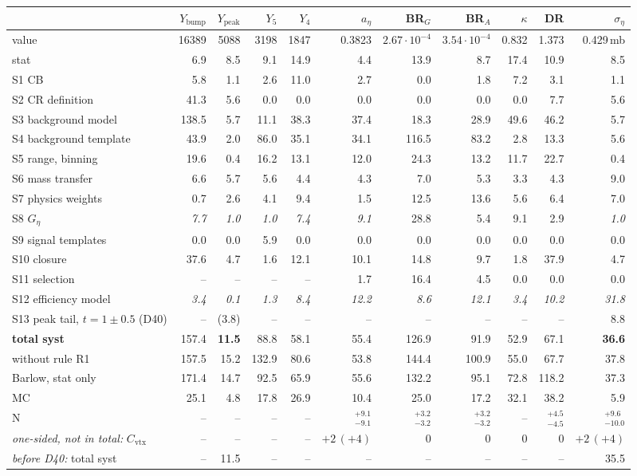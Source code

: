 \begin{tabular}{lrrrrrrrrrr}
\toprule
 & $Y_\mathrm{bump}$ & $Y_\mathrm{peak}$ & $Y_5$ & $Y_4$ & $a_\eta$ & BR$_G$ & BR$_A$ & $\kappa$ & DR & $\sigma_\eta$ \\
\midrule
value & 16389 & 5088 & 3198 & 1847 & 0.3823 & $2.67\cdot10^{-4}$ & $3.54\cdot10^{-4}$ & 0.832 & 1.373 & 0.429\,mb \\
stat & 6.9 & 8.5 & 9.1 & 14.9 & 4.4 & 13.9 & 8.7 & 17.4 & 10.9 & 8.5 \\
\midrule
S1 CB & 5.8 & 1.1 & 2.6 & 11.0 & 2.7 & 0.0 & 1.8 & 7.2 & 3.1 & 1.1 \\
S2 CR definition & 41.3 & 5.6 & 0.0 & 0.0 & 0.0 & 0.0 & 0.0 & 0.0 & 7.7 & 5.6 \\
S3 background model & 138.5 & 5.7 & 11.1 & 38.3 & 37.4 & 18.3 & 28.9 & 49.6 & 46.2 & 5.7 \\
S4 background template & 43.9 & 2.0 & 86.0 & 35.1 & 34.1 & 116.5 & 83.2 & 2.8 & 13.3 & 5.6 \\
S5 range, binning & 19.6 & 0.4 & 16.2 & 13.1 & 12.0 & 24.3 & 13.2 & 11.7 & 22.7 & 0.4 \\
S6 mass transfer & 6.6 & 5.7 & 5.6 & 4.4 & 4.3 & 7.0 & 5.3 & 3.3 & 4.3 & 9.0 \\
S7 physics weights & 0.7 & 2.6 & 4.1 & 9.4 & 1.5 & 12.5 & 13.6 & 5.6 & 6.4 & 7.0 \\
S8 $G_\eta$ & \textit{7.7} & \textit{1.0} & \textit{1.0} & \textit{7.4} & \textit{9.1} & 28.8 & 5.4 & 9.1 & 2.9 & \textit{1.0} \\
S9 signal templates & 0.0 & 0.0 & 5.9 & 0.0 & 0.0 & 0.0 & 0.0 & 0.0 & 0.0 & 0.0 \\
S10 closure & 37.6 & 4.7 & 1.6 & 12.1 & 10.1 & 14.8 & 9.7 & 1.8 & 37.9 & 4.7 \\
S11 selection & -- & -- & -- & -- & 1.7 & 16.4 & 4.5 & 0.0 & 0.0 & 0.0 \\
S12 efficiency model & \textit{3.4} & \textit{0.1} & \textit{1.3} & \textit{8.4} & \textit{12.2} & \textit{8.6} & \textit{12.1} & \textit{3.4} & \textit{10.2} & \textit{31.8} \\
S13 peak tail, $t=1\pm0.5$ (D40) & -- & (3.8) & -- & -- & -- & -- & -- & -- & -- & 8.8 \\
\midrule
\textbf{total syst} & 157.4 & \textbf{11.5} & 88.8 & 58.1 & 55.4 & 126.9 & 91.9 & 52.9 & 67.1 & \textbf{36.6} \\
\quad without rule R1 & 157.5 & 15.2 & 132.9 & 80.6 & 53.8 & 144.4 & 100.9 & 55.0 & 67.7 & 37.8 \\
\quad Barlow, stat only & 171.4 & 14.7 & 92.5 & 65.9 & 55.6 & 132.2 & 95.1 & 72.8 & 118.2 & 37.3 \\
MC & 25.1 & 4.8 & 17.8 & 26.9 & 10.4 & 25.0 & 17.2 & 32.1 & 38.2 & 5.9 \\
N & -- & -- & -- & -- & $^{+9.1}_{-9.1}$ & $^{+3.2}_{-3.2}$ & $^{+3.2}_{-3.2}$ & -- & $^{+4.5}_{-4.5}$ & $^{+9.6}_{-10.0}$ \\
\midrule
\textit{one-sided, not in total:} $C_{\mathrm{vtx}}$ & -- & -- & -- & -- & $+2\,(+4)$ & 0 & 0 & 0 & 0 & $+2\,(+4)$ \\
\textit{before D40:} total syst & -- & 11.5 & -- & -- & -- & -- & -- & -- & -- & 35.5 \\
\bottomrule
\end{tabular}
